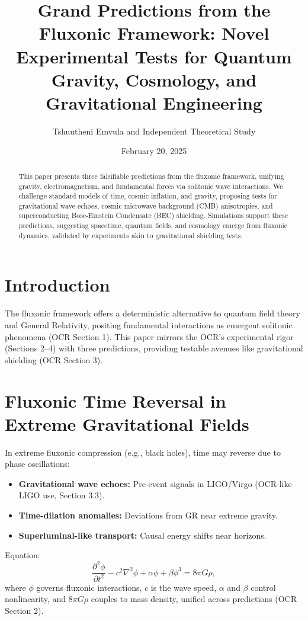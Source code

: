 \documentclass{article}
\title{Grand Predictions from the Fluxonic Framework: Novel Experimental Tests for Quantum Gravity, Cosmology, and Gravitational Engineering}
\author{Tshuutheni Emvula and Independent Theoretical Study}
\date{February 20, 2025}
\begin{document}
\maketitle

\begin{abstract}
This paper presents three falsifiable predictions from the fluxonic framework, unifying gravity, electromagnetism, and fundamental forces via solitonic wave interactions. We challenge standard models of time, cosmic inflation, and gravity, proposing tests for gravitational wave echoes, cosmic microwave background (CMB) anisotropies, and superconducting Bose-Einstein Condensate (BEC) shielding. Simulations support these predictions, suggesting spacetime, quantum fields, and cosmology emerge from fluxonic dynamics, validated by experiments akin to gravitational shielding tests.
\end{abstract}

\section{Introduction}
The fluxonic framework offers a deterministic alternative to quantum field theory and General Relativity, positing fundamental interactions as emergent solitonic phenomena (OCR Section 1). This paper mirrors the OCR’s experimental rigor (Sections 2–4) with three predictions, providing testable avenues like gravitational shielding (OCR Section 3).

\section{Fluxonic Time Reversal in Extreme Gravitational Fields}
In extreme fluxonic compression (e.g., black holes), time may reverse due to phase oscillations:
\begin{itemize}
    \item \textbf{Gravitational wave echoes:} Pre-event signals in LIGO/Virgo (OCR-like LIGO use, Section 3.3).
    \item \textbf{Time-dilation anomalies:} Deviations from GR near extreme gravity.
    \item \textbf{Superluminal-like transport:} Causal energy shifts near horizons.
\end{itemize}
Equation:
\begin{equation}
\frac{\partial^2 \phi}{\partial t^2} - c^2 \nabla^2 \phi + \alpha \phi + \beta \phi^3 = 8 \pi G \rho,
\end{equation}
where \(\phi\) governs fluxonic interactions, \(c\) is the wave speed, \(\alpha\) and \(\beta\) control nonlinearity, and \(8 \pi G \rho\) couples to mass density, unified across predictions (OCR Section 2).
\end{document}
